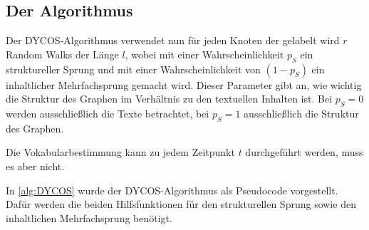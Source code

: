 


\subsection{Der Algorithmus}
Der DYCOS-Algorithmus verwendet nun für jeden Knoten der gelabelt wird
$r$ Random Walks der Länge $l$, wobei mit einer Wahrscheinlichkeit 
$p_S$ ein struktureller Sprung und mit einer Wahrscheinlichkeit
von $(1-p_S)$ ein inhaltlicher Mehrfachsprung gemacht wird. Dieser 
Parameter gibt an, wie wichtig die Struktur des Graphen im Verhältnis
zu den textuellen Inhalten ist. Bei $p_S = 0$ werden ausschließlich
die Texte betrachtet, bei $p_S = 1$ ausschließlich die Struktur des
Graphen.

Die Vokabularbestimmung kann zu jedem Zeitpunkt $t$ durchgeführt 
werden, muss es aber nicht.

In \cref{alg:DYCOS} wurde der DYCOS-Algorithmus als 
Pseudocode vorgestellt. Dafür werden die beiden Hilfsfunktionen 
für den strukturellen Sprung sowie den inhaltlichen Mehrfachsprung
benötigt.

